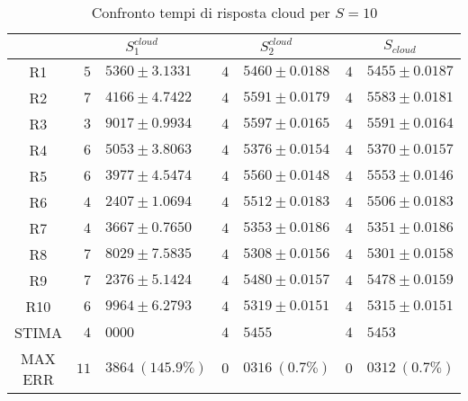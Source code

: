 \begin{table}[!h]
\begin{tabular}{c|r@{.}l|r@{.}l|r@{.}l}
& \multicolumn{2}{|c|}{$S_1^{cloud}$}
& \multicolumn{2}{|c|}{$S_2^{cloud}$}
& \multicolumn{2}{|c}{$S_{cloud}$} 
\\          
\hline
R1      & $5$&$5360 \pm 3.1331$   & $4$&$5460 \pm 0.0188$ & $4$&$5455 \pm 0.0187$ \\
R2      & $7$&$4166 \pm 4.7422$   & $4$&$5591 \pm 0.0179$ & $4$&$5583 \pm 0.0181$ \\
R3      & $3$&$9017 \pm 0.9934$   & $4$&$5597 \pm 0.0165$ & $4$&$5591 \pm 0.0164$ \\
R4      & $6$&$5053 \pm 3.8063$   & $4$&$5376 \pm 0.0154$ & $4$&$5370 \pm 0.0157$ \\
R5      & $6$&$3977 \pm 4.5474$   & $4$&$5560 \pm 0.0148$ & $4$&$5553 \pm 0.0146$ \\
R6      & $4$&$2407 \pm 1.0694$   & $4$&$5512 \pm 0.0183$ & $4$&$5506 \pm 0.0183$ \\
R7      & $4$&$3667 \pm 0.7650$   & $4$&$5353 \pm 0.0186$ & $4$&$5351 \pm 0.0186$ \\
R8      & $7$&$8029 \pm 7.5835$   & $4$&$5308 \pm 0.0156$ & $4$&$5301 \pm 0.0158$ \\
R9      & $7$&$2376 \pm 5.1424$   & $4$&$5480 \pm 0.0157$ & $4$&$5478 \pm 0.0159$ \\
R10     & $6$&$9964 \pm 6.2793$   & $4$&$5319 \pm 0.0151$ & $4$&$5315 \pm 0.0151$ \\
STIMA   & $4$&$0000$              & $4$&$5455$            & $4$&$5453$            \\
MAX ERR & $11$&$3864 \ (145.9\%)$ & $0$&$0316 \ (0.7\%)$  & $0$&$0312 \ (0.7\%)$    
\end{tabular}
\centering
\caption{Confronto tempi di risposta cloud per $S=10$}
\label{tab:10_scloud}
\end{table}
